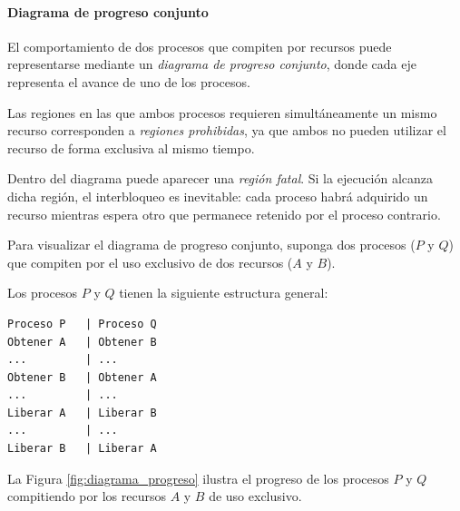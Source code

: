 \paragraph{Diagrama de progreso conjunto}

El comportamiento de dos procesos que compiten por recursos puede representarse mediante un \textit{diagrama de progreso conjunto}, donde cada eje representa el avance de uno de los procesos.

Las regiones en las que ambos procesos requieren simultáneamente un mismo recurso corresponden a \textit{regiones prohibidas}, ya que ambos no pueden utilizar el recurso de forma exclusiva al mismo tiempo.

Dentro del diagrama puede aparecer una \textit{región fatal}. Si la ejecución alcanza dicha región, el interbloqueo es inevitable: cada proceso habrá adquirido un recurso mientras espera otro que permanece retenido por el proceso contrario.


Para visualizar el diagrama de progreso conjunto, suponga dos procesos (\(P\) y \(Q\)) que compiten por el uso exclusivo de dos recursos (\(A\) y \(B\)). 

Los procesos \(P\) y \(Q\) tienen la siguiente estructura general:
\begin{center}
\begin{minipage}{5cm}
\centering
\begingroup
\footnotesize
\begin{verbatim}
Proceso P   | Proceso Q
Obtener A   | Obtener B 
...         | ... 
Obtener B   | Obtener A 
...         | ... 
Liberar A   | Liberar B 
...         | ... 
Liberar B   | Liberar A 
\end{verbatim}
\endgroup
\end{minipage}
\end{center}

La Figura \ref{fig:diagrama_progreso} ilustra el progreso de los procesos \(P\) y \(Q\) compitiendo por los recursos \(A\) y \(B\) de uso exclusivo. 

